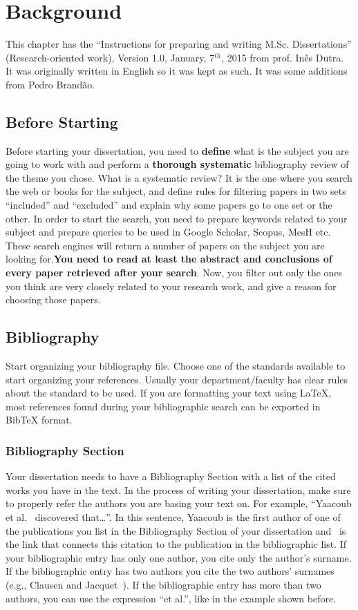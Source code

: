 \chapter{Background}\label{chap:back}

This chapter has the ``Instructions for preparing and writing M.Sc. Dissertations'' (Research-oriented work), 
Version 1.0, January, 7$^{th}$, 2015 from prof. Inês Dutra. It was originally written in English so it was kept as such. It was some additions from Pedro Brandão.

\section{Before Starting}
Before starting your dissertation, you need to \textbf{define} what is the subject you are going to work
with and perform a \textbf{thorough systematic} bibliography review of the theme you chose.
What is a systematic review? It is the one where you search the web or books for the subject, and
define rules for filtering papers in two sets “included” and “excluded” and explain why some papers
go to one set or the other.
In order to start the search, you need to prepare keywords related to your subject and prepare
queries to be used in Google Scholar, Scopus, MesH etc. These search engines will return a number
of papers on the subject you are looking for.\textbf{You need to read at least the abstract and 
conclusions of every paper retrieved after your search}. Now, you filter out only the ones you
think are very closely related to your research work, and give a reason for choosing those papers.

\section{Bibliography}
 Start organizing your bibliography file. Choose one of the standards available to start organizing
your references. Usually your department/faculty has clear rules about the standard to be used. If
you are formatting your text using \LaTeX, most references found during your bibliographic search
can be exported in BibTeX format.

\subsection{Bibliography Section}
Your dissertation needs to have a Bibliography Section with a list of the cited works you have in
the text. In the process of writing your dissertation, make sure to properly refer the authors you are
basing your text on. For example, “Yaacoub et al.~\cite{yaacoub2012} discovered that\ldots”. In this sentence, Yaacoub is the
first author of one of the publications you list in the Bibliography Section of your dissertation and~\cite{yaacoub2012} is the link that connects this citation to the publication in the bibliographic list. If your
bibliographic entry has only one author, you cite only the author's surname. If the bibliographic
entry has two authors you cite the two authors' surnames (e.g., Clausen and Jacquet~\cite{Clausen2003}). If the
bibliographic entry has more than two authors, you can use the expression “et al.”, like in the
example shown before.

